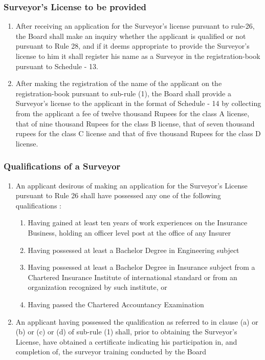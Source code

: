 \subsubsection{Surveyor's License to be provided}
\begin{enumerate}
	\item After receiving an application for the Surveyor's license pursuant to rule-26, the Board shall make an inquiry whether the applicant is qualified or not pursuant to Rule 28, and if it deems appropriate to provide the Surveyor's license to him it shall register his name as a Surveyor in the registration-book pursuant to Schedule - 13.
	\item After making the registration of the name of the applicant on the registration-book pursuant
	to sub-rule (1), the Board shall provide a Surveyor's license to the applicant in the format of Schedule - 14 by collecting from the applicant a fee of twelve thousand Rupees for the class A license, that of nine thousand Rupees for the class B license, that of seven
	thousand rupees for the class C license and that of five thousand Rupees for the class D license.
\end{enumerate}
%
\subsubsection{Qualifications of a Surveyor}
\begin{enumerate}
	\item An applicant desirous of making an application for the Surveyor's License pursuant to Rule 26 shall have possessed any one of the following qualifications :
	\begin{enumerate}
		\item Having gained at least ten years of work experiences on the Insurance Business, holding
		an officer level post at the office of any Insurer
		\item  Having possessed at least a Bachelor Degree in Engineering subject
		\item Having possessed at least a Bachelor Degree in Insurance subject from a Chartered Insurance Institute of international standard or from an organization recognized by such
		institute, or
		\item Having passed the Chartered Accountancy Examination
	\end{enumerate}
	\item An applicant having possessed the qualification as referred to in clause (a) or (b) or (c) or
	(d) of sub-rule (1) shall, prior to obtaining the Surveyor's License, have obtained a certificate indicating his participation in, and completion of, the surveyor training conducted by the Board
\end{enumerate}
%
